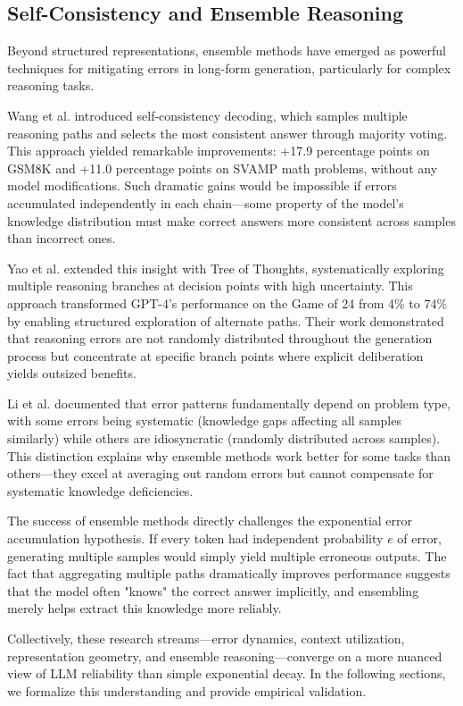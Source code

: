 \documentclass{article}
\begin{document}
\subsection{Self-Consistency and Ensemble Reasoning}

Beyond structured representations, ensemble methods have emerged as powerful techniques for mitigating errors in long-form generation, particularly for complex reasoning tasks.

Wang et al. \citep{wang2023self} introduced self-consistency decoding, which samples multiple reasoning paths and selects the most consistent answer through majority voting. This approach yielded remarkable improvements: +17.9 percentage points on GSM8K and +11.0 percentage points on SVAMP math problems, without any model modifications. Such dramatic gains would be impossible if errors accumulated independently in each chain—some property of the model's knowledge distribution must make correct answers more consistent across samples than incorrect ones.

Yao et al. \citep{yao2023tree} extended this insight with Tree of Thoughts, systematically exploring multiple reasoning branches at decision points with high uncertainty. This approach transformed GPT-4's performance on the Game of 24 from 4\% to 74\% by enabling structured exploration of alternate paths. Their work demonstrated that reasoning errors are not randomly distributed throughout the generation process but concentrate at specific branch points where explicit deliberation yields outsized benefits.

Li et al. \citep{li2023reliability} documented that error patterns fundamentally depend on problem type, with some errors being systematic (knowledge gaps affecting all samples similarly) while others are idiosyncratic (randomly distributed across samples). This distinction explains why ensemble methods work better for some tasks than others—they excel at averaging out random errors but cannot compensate for systematic knowledge deficiencies.

The success of ensemble methods directly challenges the exponential error accumulation hypothesis. If every token had independent probability $e$ of error, generating multiple samples would simply yield multiple erroneous outputs. The fact that aggregating multiple paths dramatically improves performance suggests that the model often "knows" the correct answer implicitly, and ensembling merely helps extract this knowledge more reliably.

Collectively, these research streams—error dynamics, context utilization, representation geometry, and ensemble reasoning—converge on a more nuanced view of LLM reliability than simple exponential decay. In the following sections, we formalize this understanding and provide empirical validation.
\end{document}

